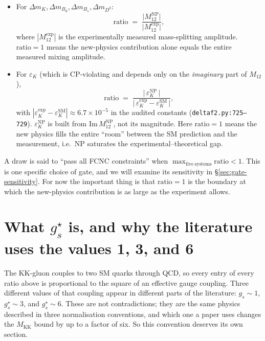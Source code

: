 \documentclass[11pt]{article}
\newcommand{\Mkk}{M_{\mathrm{KK}}}
\newcommand{\gs}{g_s^{\star}}
\newcommand{\eK}{\varepsilon_K}
\newcommand{\dmK}{\Delta m_K}
\newcommand{\dmBd}{\Delta m_{B_d}}
\newcommand{\dmBs}{\Delta m_{B_s}}
\newcommand{\dmD}{\Delta m_{D^0}}
\begin{document}
\begin{itemize}[leftmargin=2em,itemsep=4pt]
  \item For $\dmK,\dmBd,\dmBs,\dmD$:
        \begin{equation}
          \mathrm{ratio} \;=\;
          \frac{\bigl|M_{12}^{\mathrm{NP}}\bigr|}
               {\bigl|M_{12}^{\mathrm{exp}}\bigr|},
          \label{eq:ratio-mass}
        \end{equation}
        where $|M_{12}^{\mathrm{exp}}|$ is the experimentally measured
        mass-splitting amplitude. $\mathrm{ratio} = 1$ means the
        new-physics contribution alone equals the entire measured mixing
        amplitude.

  \item For $\eK$ (which is CP-violating and depends only on the
        \emph{imaginary} part of $M_{12}$),
        \begin{equation}
          \mathrm{ratio} \;=\;
          \frac{\bigl|\,\eK^{\mathrm{NP}}\,\bigr|}
               {\bigl|\,\eK^{\mathrm{exp}} - \eK^{\mathrm{SM}}\,\bigr|},
          \label{eq:ratio-epsK}
        \end{equation}
        with $|\eK^{\mathrm{exp}} - \eK^{\mathrm{SM}}| \approx 6.7\times10^{-5}$
        in the audited constants
        (\texttt{deltaf2.py:725--729}). $\eK^{\mathrm{NP}}$ is built from
        $\mathrm{Im}\,M_{12}^{\mathrm{NP}}$, not its magnitude. Here
        $\mathrm{ratio} = 1$ means the new physics fills the entire ``room''
        between the SM prediction and the measurement, i.e.\ NP saturates
        the experimental--theoretical gap.
\end{itemize}

A draw is said to ``pass all FCNC constraints'' when
$\max_{\mathrm{five\ systems}}\mathrm{ratio} < 1$. This is one specific
choice of gate, and we will examine its sensitivity in
\S\ref{sec:gate-sensitivity}. For now the important thing is that
$\mathrm{ratio} = 1$ is the boundary at which the new-physics contribution
is as large as the experiment allows.

\section{What \texorpdfstring{$\gs$}{g\_s*} is, and why the literature uses
         the values 1, 3, and 6}
\label{sec:gauge-coupling}

The KK-gluon couples to two SM quarks through QCD, so every entry of every
ratio above is proportional to the square of an effective gauge coupling.
Three different values of that coupling appear in different parts of the
literature: $g_s\!\sim\!1$, $\gs\!\sim\!3$, and $\gs\!\sim\!6$. These are
not contradictions; they are the same physics described in three
normalisation conventions, and which one a paper uses changes the
$\Mkk$ bound by up to a factor of six. So this convention deserves its own
section.
\end{document}
